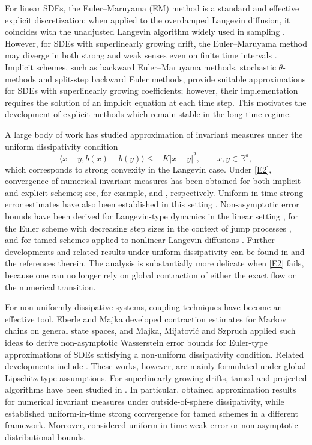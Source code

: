 \documentclass[aap]{imsart}
\theoremstyle{plain}
\theoremstyle{definition}
\begin{document}
For linear SDEs, the Euler--Maruyama (EM) method is a standard and effective explicit discretization; when applied to the overdamped Langevin diffusion, it coincides with the unadjusted Langevin algorithm widely used in sampling \cite{Bernoulli}. However, for SDEs with superlinearly growing drift, the Euler--Maruyama method may diverge in both strong and weak senses even on finite time intervals \cite{Hutzenthaler}. Implicit schemes, such as backward Euler--Maruyama methods, stochastic $\theta$-methods and split-step backward Euler methods, provide suitable approximations for SDEs with superlinearly growing coefficients; however, their implementation requires the solution of an implicit equation at each time step. This motivates the development of explicit methods which remain stable in the long-time regime.

A large body of work has studied approximation of invariant measures under the uniform dissipativity condition
\begin{equation}\label{E2}
	\langle x-y,b(x)-b(y)\rangle\leqslant -K|x-y|^2,\qquad x,y\in\mathbb R^d ,
\end{equation}
which corresponds to strong convexity in the Langevin case. Under \eqref{E2}, convergence of numerical invariant measures has been obtained for both implicit and explicit schemes; see, for example, \cite{Brehier, ChenC, AMO, JiangY, LiuW, IM3, Talay} and \cite{IM2, IMA, SIAM}, respectively. Uniform-in-time strong error estimates have also been established in this setting \cite{Cui YP, Wu XM}. Non-asymptotic error bounds have been derived for Langevin-type dynamics in the linear setting \cite{JLMR}, for the Euler scheme with decreasing step sizes in the context of jump processes \cite{IM1}, and for tamed schemes applied to nonlinear Langevin diffusions \cite{Bro}. Further developments and related results under uniform dissipativity can be found in \cite{W.F, N.K} and the references therein. The analysis is substantially more delicate when \eqref{E2} fails, because one can no longer rely on global contraction of either the exact flow or the numerical transition.

For non-uniformly dissipative systems, coupling techniques have become an effective tool. Eberle and Majka \cite{EJP} developed contraction estimates for Markov chains on general state spaces, and Majka, Mijatovi\'c and Szpruch \cite{Majka} applied such ideas to derive non-asymptotic Wasserstein error bounds for Euler-type approximations of SDEs satisfying a non-uniform dissipativity condition. Related developments include \cite{Huang, 2025SPA, Schuh}. These works, however, are mainly formulated under global Lipschitz-type assumptions. For superlinearly growing drifts, tamed and projected algorithms have been studied in \cite{Bao, Bao1, Bao2, Bro, L.ZH, A.D. N, P.C}. In particular, \cite{Bao, Bao2, A.D. N} obtained approximation results for numerical invariant measures under outside-of-sphere dissipativity, while \cite{Bao1} established uniform-in-time strong convergence for tamed schemes in a different framework. Moreover, \cite{P.C, L.ZH} considered uniform-in-time weak error or non-asymptotic distributional bounds.
\end{document}
